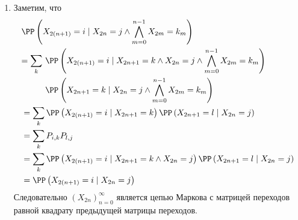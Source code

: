 \documentclass[12pt,a4paper]{article}
\begin{document}
\begin{enumproblem}
\begin{enumerate}
            \item Заметим, что
                \begin{align*}
                    &\PP\left(X_{2(n+1)} = i \mid X_{2n} = j \wedge \bigwedge_{m=0}^{n-1} X_{2m} = k_{m}\right)\\
                    &\begin{aligned}
                        = \sum_{k}\ &\PP\left(X_{2(n+1)} = i \mid X_{2n+1} = k \wedge X_{2n} = j \wedge \bigwedge_{m=0}^{n-1} X_{2m} = k_{m}\right)\\
                        &\PP\left(X_{2n+1} = k \mid X_{2n} = j \wedge \bigwedge_{m=0}^{n-1} X_{2m} = k_{m}\right)
                    \end{aligned}\\
                    &= \sum_{k} \PP\left(X_{2(n+1)} = i \mid X_{2n+1} = k\right) \PP\left(X_{2n+1} = l \mid X_{2n} = j\right)\\
                    &= \sum_{k} P_{i, k} P_{l, j}\\
                    &= \sum_{k} \PP\left(X_{2(n+1)} = i \mid X_{2n+1} = k \wedge X_{2n} = j\right) \PP\left(X_{2n+1} = l \mid X_{2n} = j\right)\\
                    &= \PP\left(X_{2(n+1)} = i \mid X_{2n} = j\right)
                \end{align*}
                Следовательно $(X_{2n})_{n=0}^\infty$ является цепью Маркова с матрицей переходов равной квадрату предыдущей матрицы переходов.


\end{enumerate}
\end{enumproblem}
\end{document}
